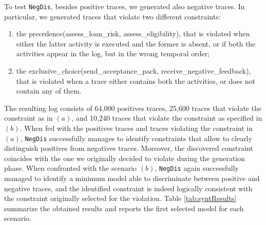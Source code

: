 \documentclass[a4wide,11pt]{article}
\theoremstyle{definition}
\theoremstyle{plain}
\newcommand{\nd}{\texttt{NegDis}\xspace}
\begin{document}
To test \nd, besides positive traces, we generated also negative traces. In particular, we generated traces that violate two different constraints:
\begin{enumerate}[label=(\textit{\alph*})]
\item the \textsf{precedence(assess\_loan\_risk, assess\_eligibility)}, that is violated when either the latter activity is executed and the former is absent, or if both the activities appear in the log, but in the wrong temporal order;
%
\item the \textsf{exclusive\_choice(send\_acceptance\_pack, receive\_negative\_feedback)}, that is violated when a trace either contains both the activities, or does not contain any of them.
\end{enumerate}
%
The resulting log consists of 64,000 positives traces, 25,600 traces that violate the constraint as in $(a)$, and 10,240 traces that violate the constraint as specified in $(b)$.
%
When fed with the positives traces and traces violating the constraint in $(a)$, \nd successfully manages to identify constraints that allow to clearly distinguish positives from negatives traces. Moreover, the discovered constraint coincides with the one we originally decided to violate during the generation phase. When confronted with the scenario $(b)$, \nd again successfully managed to identify a minimum model able to discriminate between positive and negative traces, and the identified constraint is indeed logically consistent with the constraint originally selected for the violation.
Table \ref{tab:syntResults} summarize the obtained results and reports the first selected model for each scenario.
\end{document}
